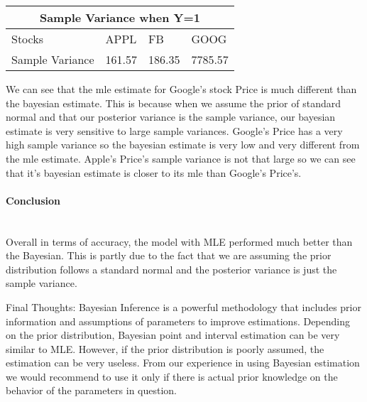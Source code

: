 \documentclass{article}
\begin{document}
\begin{center}
\begin{tabular}{|p{3cm}|p{1cm}|p{1cm}|p{1cm}|  }
 \hline
 \multicolumn{4}{|c|}{Sample Variance when Y=1} \\
 \hline
 Stocks & APPL & FB & GOOG\\
 \hline
 Sample Variance & 161.57 & 186.35 & 7785.57 \\
 \hline
\end{tabular}
\end{center}

\mbox{}\newline
We can see that the mle estimate for Google's stock Price is much different than the bayesian estimate. This is because when we assume the prior of standard normal and that our posterior variance is the sample variance, our bayesian estimate is very sensitive to large sample variances. Google's Price has a very high sample variance so the bayesian estimate is very low and very different from the mle estimate. Apple's Price's sample variance is not that large so we can see that it's bayesian estimate is closer to its mle than Google's Price's.

\paragraph{Conclusion}\mbox{}\\

Overall in terms of accuracy, the model with MLE performed much better than the Bayesian. This is partly due to the fact that we are assuming the prior distribution follows a standard normal and the posterior variance is just the sample variance. \newline

Final Thoughts:
Bayesian Inference is a powerful methodology that includes prior information and assumptions of parameters to improve estimations. Depending on the prior distribution, Bayesian point and interval estimation can be very similar to MLE. However, if the prior distribution is poorly assumed, the estimation can be very useless. From our experience in using Bayesian estimation we would recommend to use it only if there is actual prior knowledge on the behavior of the parameters in question.\newline
\end{document}
